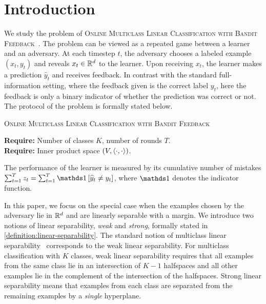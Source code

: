\section{Introduction}
\label{section:introduction}

We study the problem of \textsc{Online Multiclass Linear Classification with
Bandit Feedback}~\citep{Kakade-Shalev-Shwartz-Tewari-2008}. The problem can be
viewed as a repeated game between a learner and an adversary. At each timestep
$t$, the adversary chooses a labeled example $(x_t, y_t)$ and reveals $x_t\in
\mathbb{R}^d$ to the learner. Upon receiving $x_t$, the learner makes a prediction
$\widehat{y}_t$ and receives feedback. In contrast with the standard
full-information setting, where the feedback given is the correct label $y_t$,
here the feedback is only a binary indicator of whether the prediction was
correct or not. The protocol of the problem is formally stated below.

\begin{protocol}[h]
\caption{\textsc{Online Multiclass Linear Classification with Bandit Feedback}
\label{algorithm:game-protocol}}
\textbf{Require:} Number of classes $K$, number of rounds $T$. \\
\textbf{Require:} Inner product space $(V,\left\langle \cdot, \cdot \right\rangle)$. \\
\end{protocol}

The performance of the learner is measured by its cumulative number of
mistakes $\sum_{t=1}^T z_t = \sum_{t=1}^T \indicator{\widehat y_t \neq y_t}$,
where $\one$ denotes the indicator function.

In this paper, we focus on the special case when the examples chosen by the
adversary lie in $\mathbb{R}^d$ and are linearly separable with a margin. We introduce
two notions of linear separability, \emph{weak} and \emph{strong}, formally
stated in \autoref{definition:linear-separability}. The standard notion of
multiclass linear separability~\citep{Crammer-Singer-2003} corresponds to the
weak linear separability. For multiclass classification with $K$ classes, weak
linear separability requires that all examples from the same class lie in an
intersection of $K-1$ halfspaces and all other examples lie in the complement of
the intersection of the halfspaces. Strong linear separability means that
examples from each class are separated from the remaining examples by a
\emph{single} hyperplane.

